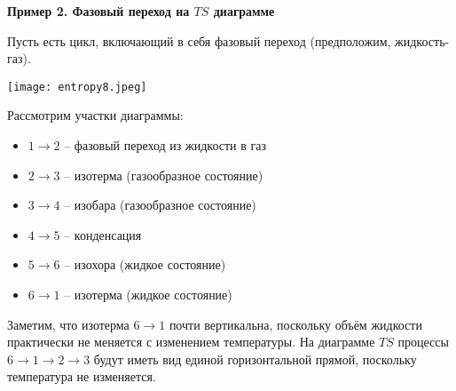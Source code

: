 \documentclass[12pt, a4paper]{article}%
\begin{document}
\textbf{Пример 2. Фазовый переход на $TS$ диаграмме} 


Пусть есть цикл, включающий в себя фазовый переход (предположим, жидкость-газ).


\begin{center}
\texttt{[image: entropy8.jpeg]}
\label{fig:mpr}
\end{center}

Рассмотрим участки диаграммы:
\begin{itemize}

\item $1\rightarrow2$ – фазовый переход из жидкости в газ~ 
\item $2\rightarrow3$ – изотерма (газообразное состояние) 
\item $3\rightarrow4$ – изобара (газообразное состояние) 
\item $4\rightarrow5$ – конденсация 
\item $5\rightarrow6$ – изохора (жидкое состояние) 
\item $6\rightarrow1$ – изотерма (жидкое состояние) 
\end{itemize}
Заметим, что изотерма $6\rightarrow1$ почти вертикальна, поскольку объём жидкости практически не меняется с изменением температуры.
На диаграмме $TS$ процессы $6\rightarrow1\rightarrow2\rightarrow3$ будут иметь вид единой горизонтальной прямой, поскольку температура не изменяется.
\end{document}
